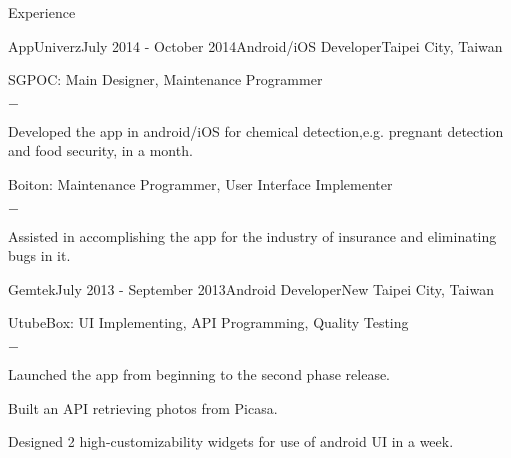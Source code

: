 \documentclass{resume} %
\begin{document}
\begin{rSection}{Experience}

\begin{rSubsection}{AppUniverz}{July 2014 - October 2014}{Android/iOS Developer}{Taipei City, Taiwan}
\item SGPOC: Main Designer, Maintenance Programmer
	\begin{cvItemize}{$-$}
		\item Developed the app in android/iOS for chemical detection,e.g. pregnant detection and food security, in a month. 
	\end{cvItemize}
\item Boiton: Maintenance Programmer, User Interface Implementer
	\begin{cvItemize}{$-$}
		\item Assisted in accomplishing the app for the industry of insurance and eliminating bugs in it.
	\end{cvItemize}
\end{rSubsection}


\begin{rSubsection}{Gemtek}{July 2013 - September 2013}{Android Developer}{New Taipei City, Taiwan}
\item UtubeBox: UI Implementing, API Programming, Quality Testing
	\begin{cvItemize}{$-$}
		\item Launched the app from beginning to the second phase release.
		\item Built an API retrieving photos from Picasa.
		\item Designed 2 high-customizability widgets for use of android UI in a week.
	\end{cvItemize}
\end{rSubsection}

\end{rSection}


\end{document}
